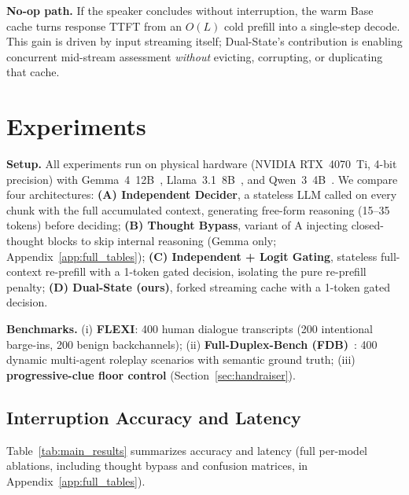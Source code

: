 \documentclass{article}
\begin{document}
\textbf{No-op path.} If the speaker concludes without interruption, the warm Base cache turns response TTFT from an $O(L)$ cold prefill into a single-step decode. This gain is driven by input streaming itself; Dual-State's contribution is enabling concurrent mid-stream assessment \emph{without} evicting, corrupting, or duplicating that cache.

\section{Experiments}
\label{sec:exp}

\textbf{Setup.} All experiments run on physical hardware (NVIDIA RTX~4070~Ti, 4-bit precision) with Gemma~4~12B~\citep{gemmateam2026gemma4}, Llama~3.1~8B~\citep{grattafiori2024llama3}, and Qwen~3~4B~\citep{yang2025qwen3}. We compare four architectures: \textbf{(A) Independent Decider}, a stateless LLM called on every chunk with the full accumulated context, generating free-form reasoning (15--35 tokens) before deciding; \textbf{(B) Thought Bypass}, variant of A injecting closed-thought blocks to skip internal reasoning (Gemma only; Appendix~\ref{app:full_tables}); \textbf{(C) Independent + Logit Gating}, stateless full-context re-prefill with a 1-token gated decision, isolating the pure re-prefill penalty; \textbf{(D) Dual-State (ours)}, forked streaming cache with a 1-token gated decision.

\textbf{Benchmarks.} (i) \textbf{FLEXI}: 400 human dialogue transcripts (200 intentional barge-ins, 200 benign backchannels); (ii) \textbf{Full-Duplex-Bench (FDB)}~\citep{lin2025fdbench}: 400 dynamic multi-agent roleplay scenarios with semantic ground truth; (iii) \textbf{progressive-clue floor control} (Section~\ref{sec:handraiser}).

\subsection{Interruption Accuracy and Latency}
\label{sec:accuracy}

Table~\ref{tab:main_results} summarizes accuracy and latency (full per-model ablations, including thought bypass and confusion matrices, in Appendix~\ref{app:full_tables}).
\end{document}
